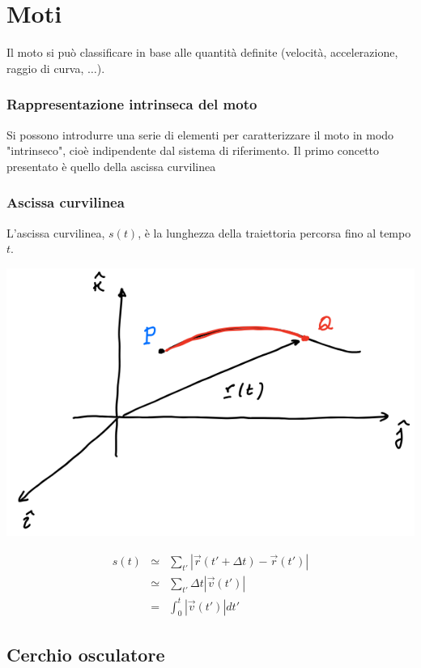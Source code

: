 \documentclass{subfiles}
\begin{document}
\section{Moti}

Il moto si può classificare in base alle quantità definite (velocità, accelerazione, raggio di curva, $\dots$).

\subsubsection{Rappresentazione intrinseca del moto}

Si possono introdurre una serie di elementi per caratterizzare il moto in modo "intrinseco", cioè indipendente dal sistema di riferimento. Il primo concetto presentato è quello della ascissa curvilinea

\subsubsection{Ascissa curvilinea}

L'ascissa curvilinea, $s(t)$, è la lunghezza della traiettoria percorsa fino al tempo $t$.

\includegraphics[width=\columnwidth]{ascissa-curvilinea}

$$
\begin{matrix}
s(t) &\simeq& \sum_{t'} |\vec{r}(t' + \Delta t) - \vec{r}(t')| \\
&\simeq& \sum_{t'} \Delta t |\vec{v}(t')| \\
&=& \int^{t}_{0}{|\vec{v}(t')| dt'}
\end{matrix}
$$

\subsection{Cerchio osculatore}
\end{document}
